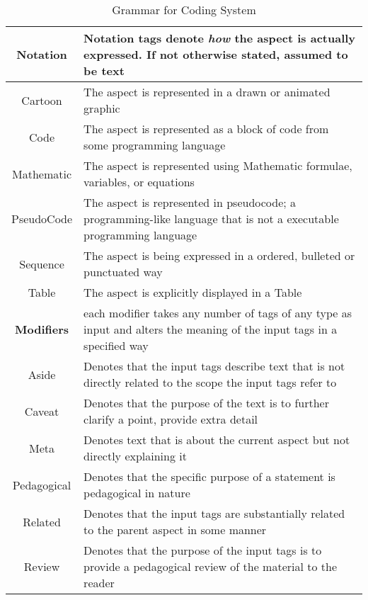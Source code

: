\begin{table}[h!]
\begin{tabular}{c p{1.8\linewidth}}
    
    \textbf{Notation} & Notation tags denote \emph{how }the aspect is actually expressed. If not otherwise stated, assumed to be text \\
    \hline
    Cartoon & The aspect is represented in a drawn or animated graphic\\
    Code & The aspect is represented as a block of code from some programming language\\
    Mathematic & The aspect is represented using Mathematic formulae, variables, or equations\\
    PseudoCode & The aspect is represented in pseudocode; a programming-like language that is not a executable programming language\\
    Sequence & The aspect is being expressed in a ordered, bulleted or punctuated way\\
    Table & The aspect is explicitly displayed in a Table\\


    \textbf{Modifiers} & each modifier takes any number of tags of any type as input and alters the meaning of the input tags in a specified way \\
    \hline
    Aside & Denotes that the input tags describe text that is not directly related to the scope the input tags refer to \\
    Caveat & Denotes that the purpose of the text is to further clarify a point, provide extra detail\\
    Meta & Denotes text that is about the current aspect but not directly explaining it\\
    Pedagogical & Denotes that the specific purpose of a statement is pedagogical in nature\\
    Related & Denotes that the input tags are substantially related to the parent aspect in some manner\\
    Review & Denotes that the purpose of the input tags is to provide a pedagogical review of the material to the reader\\
  \end{tabular}
  \caption{Grammar for Coding System}
  \label{res:tbl:grmr}
\end{table}
